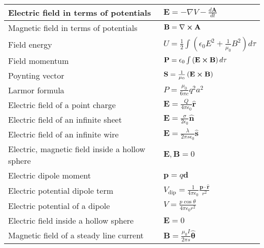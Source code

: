 \documentclass[11pt]{paper}
\begin{document}
\begin{longtable}{ll}
\multicolumn{1}{|l|}{Electric field in terms of potentials} & \multicolumn{1}{l|}{$\mathbf{E} = -\nabla V - \frac{d\mathbf{A}}{dt}$} \\ \hline
\multicolumn{1}{|l|}{Magnetic field in terms of potentials} & \multicolumn{1}{l|}{$\mathbf{B} = \nabla\cross\mathbf{A}$} \\ \hline
\multicolumn{1}{|l|}{Field energy} & \multicolumn{1}{l|}{$U = \frac{1}{2}\int \left(\epsilon_0 E^2 + \frac{1}{\mu_0}B^2\right)d\tau$} \\ \hline
\multicolumn{1}{|l|}{Field momentum} & \multicolumn{1}{l|}{$\mathbf{P} = \epsilon_0\int\left(\mathbf{E}\cross\mathbf{B}\right)d\tau$} \\ \hline
\multicolumn{1}{|l|}{Poynting vector} & \multicolumn{1}{l|}{$\mathbf{S} = \frac{1}{\mu_0}\left(\mathbf{E}\cross\mathbf{B}\right)$} \\ \hline
\multicolumn{1}{|l|}{Larmor formula} & \multicolumn{1}{l|}{$P = \frac{\mu_0}{6\pi c}q^2a^2$} \\ \hline
\multicolumn{1}{|l|}{Electric field of a point charge} & \multicolumn{1}{l|}{$\mathbf{E} = \frac{Q}{4\pi\epsilon_0}\mathbf{\hat{r}}$} \\ \hline
\multicolumn{1}{|l|}{Electric field of an infinite sheet} & \multicolumn{1}{l|}{$\mathbf{E} = \frac{\sigma}{2\epsilon_0}\mathbf{\hat{n}}$} \\ \hline
\multicolumn{1}{|l|}{Electric field of an infinite wire} & \multicolumn{1}{l|}{$\mathbf{E} = \frac{\lambda}{2\pi s\epsilon_0}\mathbf{\hat{s}}$} \\ \hline
\multicolumn{1}{|l|}{Electric, magnetic field inside a hollow sphere} & \multicolumn{1}{l|}{$\mathbf{E},\mathbf{B} = 0$} \\ \hline
\multicolumn{1}{|l|}{Electric dipole moment} & \multicolumn{1}{l|}{$\mathbf{p} = q\mathbf{d}$} \\ \hline
\multicolumn{1}{|l|}{Electric potential dipole term} & \multicolumn{1}{l|}{$V_\text{dip} = \frac{1}{4\pi\epsilon_0}\frac{\mathbf{p}\cdot\mathbf{\hat{r}}}{r^2}$} \\ \hline
\multicolumn{1}{|l|}{Electric potential of a dipole} & \multicolumn{1}{l|}{$V = \frac{p\cos\theta}{4\pi \epsilon_0 r^2}$} \\ \hline
\multicolumn{1}{|l|}{Electric field inside a hollow sphere} & \multicolumn{1}{l|}{$\mathbf{E} = 0$} \\ \hline
\multicolumn{1}{|l|}{Magnetic field of a steady line current} & \multicolumn{1}{l|}{$\mathbf{B} = \frac{\mu_0 I}{2\pi s}\mathbf{\hat{\theta}}$} \\ \hline

\end{longtable}
\end{document}
